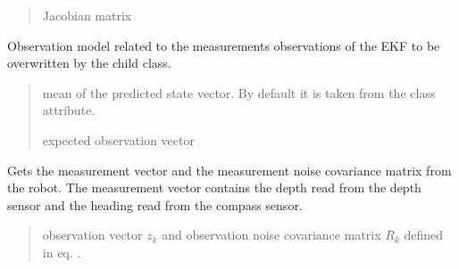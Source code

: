 \documentclass[letterpaper,10pt,english]{sphinxmanual}
\begin{document}
\begin{fulllineitems}
\begin{fulllineitems}
\begin{quote}
\begin{description}
\sphinxAtStartPar
Jacobian matrix

\end{description}\end{quote}

\end{fulllineitems}


\begin{fulllineitems}
\label{\detokenize{GFLocalization:EKF_3DOFDifferentialDriveInputDisplacement.EKF_3DOFDifferentialDriveInputDisplacement.hm}}
\pysigstartsignatures
{}
\pysigstopsignatures
\sphinxAtStartPar
Observation model related to the measurements observations of the EKF to be overwritten by the child class.
\begin{quote}\begin{description}
\sphinxAtStartPar
{} \textendash{} mean of the predicted state vector. By default it is taken from the class attribute.

\sphinxAtStartPar
expected observation vector

\end{description}\end{quote}

\end{fulllineitems}


\begin{fulllineitems}
\label{\detokenize{GFLocalization:EKF_3DOFDifferentialDriveInputDisplacement.EKF_3DOFDifferentialDriveInputDisplacement.GetMeasurements}}
\pysigstartsignatures
{}
\pysigstopsignatures
\sphinxAtStartPar
Gets the measurement vector and the measurement noise covariance matrix from the robot. The measurement vector contains the depth read from the depth sensor and the heading read from the compass sensor.
\begin{quote}\begin{description}
\sphinxAtStartPar
observation vector \(z_k\) and observation noise covariance matrix \(R_k\) defined in eq. .


\end{description}
\end{quote}
\end{fulllineitems}
\end{fulllineitems}
\end{document}
